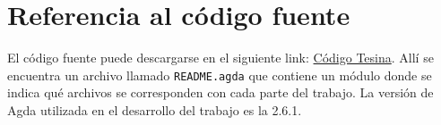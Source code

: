 \chapter{Referencia al código fuente}

El código fuente puede descargarse en el siguiente link: \href{https://github.com/ValeBini/Tesina/releases/tag/v1.0}{Código Tesina}. Allí se encuentra un archivo llamado \texttt{README.agda} que contiene un módulo  donde se indica qué archivos se corresponden con cada parte del trabajo. La versión de Agda utilizada en el desarrollo del trabajo es la 2.6.1. 
